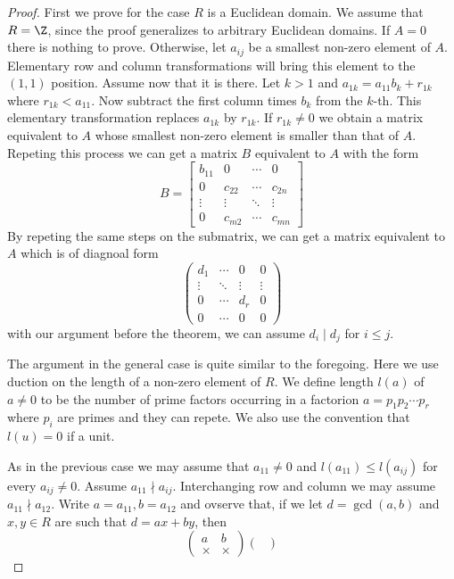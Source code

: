\begin{proof}
First we prove for the case $R$ is a Euclidean domain. We assume that $R=\Z$, since the proof generalizes to arbitrary Euclidean domains. If $A=0$ there is nothing to prove. Otherwise, let $a_{ij}$ be a smallest non-zero element of $A$. Elementary row and column transformations will bring this element to the $(1,1)$ position. Assume now that it is there. Let $k>1$ and $a_{1k}=a_{11}b_k+r_{1k}$ where $r_{1k}<a_{11}$. Now subtract the first column times $b_k$ from the $k$-th. This elementary transformation replaces $a_{1k}$ by $r_{1k}$. If $r_{1k}\neq 0$ we obtain a matrix equivalent to $A$ whose smallest non-zero element is smaller than that of $A$. Repeting this process we can get a matrix $B$ equivalent to $A$ with the form
\[B=\begin{bmatrix}
b_{11}&0&\cdots&0\\
0&c_{22}&\cdots&c_{2n}\\
\vdots&\vdots&\ddots&\vdots\\
0&c_{m2}&\cdots&c_{mn}
\end{bmatrix}\]
By repeting the same steps on the submatrix, we can get a matrix equivalent to $A$ which is of diagnoal form
\[\left(\begin{array}{ccc|c}
d_1&\cdots&0&0\\
\vdots&\ddots&\vdots&\vdots\\
0&\cdots&d_r&0\\
\hline
0&\cdots&0&0
\end{array}\right)\]
with our argument before the theorem, we can assume $d_i\mid d_j$ for $i\leq j$.\par
The argument in the general case is quite similar to the foregoing. Here we use
duction on the length of a non-zero element of $R$. We define length $l(a)$ of $a\neq0$ to be the number of prime factors occurring in a factorion $a=p_1p_2\cdots p_r$ where $p_i$ are primes and they can repete. We also use the convention that $l(u)=0$ if
a unit.\par
As in the previous case we may assume that $a_{11}\neq0$ and $l(a_{11})\leq l(a_{ij})$ for every $a_{ij}\neq 0$. Assume $a_{11}\nmid a_{ij}$. Interchanging row and column we may assume $a_{11}\nmid a_{12}$. Write $a=a_{11},b=a_{12}$ and ovserve that, if we let $d=\gcd(a,b)$ and $x,y\in R$ are such that $d=ax+by$, then
\[\begin{pmatrix}
a&b\\
\times&\times
\end{pmatrix}\begin{pmatrix}

\end{pmatrix}\]
\end{proof}
